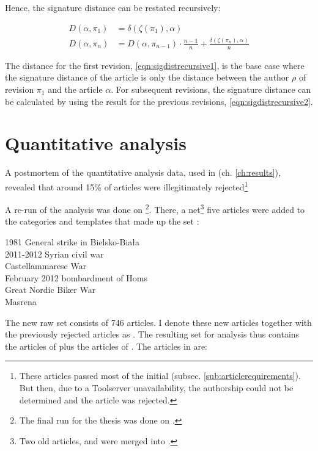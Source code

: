 Hence, the signature distance can be restated recursively:

\begin{align}
D(\alpha, \pi_{1}) &= \delta(\zeta(\pi_{1}),\alpha)\label{eqn:sigdistrecursive1}\\
D(\alpha, \pi_{n}) &=  D(\alpha, \pi_{n-1}) \cdot \frac{n-1}{n} + \frac{\delta(\zeta(\pi_{n}),\alpha)}{n} \label{eqn:sigdistrecursive2}
\end{align}

The distance for the first revision, \ref{eqn:sigdistrecursive1}, is the base case where the signature distance of the article is only the distance between the author $\rho$ of revision $\pi_{1}$ and the article $\alpha$.
For subsequent revisions, the signature distance can be calculated by using the result for the previous revisions, \ref{eqn:sigdistrecursive2}.


\section{Quantitative analysis}

A postmortem of the quantitative analysis data, used in  (ch. \ref{ch:results}), revealed that around 15\% of articles were illegitimately rejected\footnote{These articles passed most of the initial  (subsec. \ref{sub:articlerequirements}). But then, due to a Toolserver unavailability, the authorship could not be determined and the article was rejected.}

A re-run of the analysis was done on \footnote{The final run for the thesis was done on .}.
There, a net\footnote{Two old articles,  and  were merged into .} five articles were added to the categories and templates that made up the set :

\begin{multicols}{2}\scriptsize
\setlength{\parindent}{0pt}
1981 General strike in Bielsko-Biała\\
2011-2012 Syrian civil war\\
Castellammarese War\\
February 2012 bombardment of Homs\\
Great Nordic Biker War\\
Masrena
\end{multicols}

The new raw set  consists of 746 articles. 
I denote these new articles together with the previously rejected articles as .
The resulting set for analysis  thus contains the articles of  plus the articles of .
The  articles in  are:

